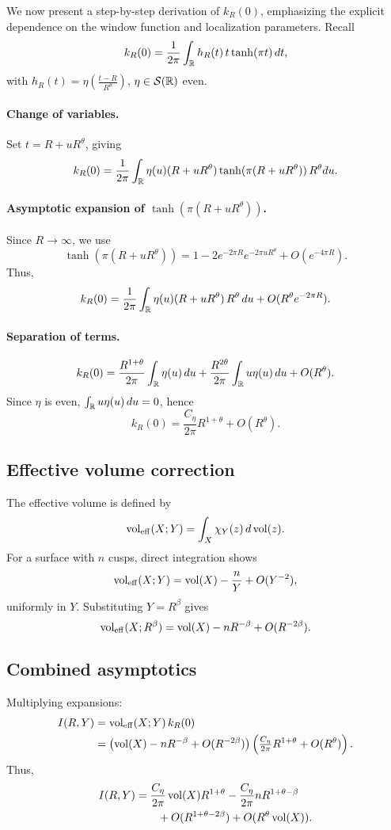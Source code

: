 We now present a step-by-step derivation of $k_R(0)$, emphasizing the explicit dependence on the window function and localization parameters. Recall
\[
k_R(0) = \frac{1}{2\pi}\int_{\mathbb{R}} h_R(t)\,t\tanh(\pi t)\,dt,
\]
with $h_R(t) = \eta\!\left(\tfrac{t-R}{R^\theta}\right)$, $\eta\in\mathcal{S}(\mathbb{R})$ even.

\paragraph{Change of variables.} Set $t=R+uR^\theta$, giving
\[
k_R(0) = \frac{1}{2\pi}\int_{\mathbb{R}} \eta(u)(R+uR^\theta)\tanh(\pi(R+uR^\theta))\,R^\theta du.
\]

\paragraph{Asymptotic expansion of $\tanh(\pi(R+uR^\theta))$.} Since $R\to\infty$, we use
\[
\tanh(\pi(R+uR^\theta)) = 1 - 2e^{-2\pi R}e^{-2\pi u R^\theta} + O(e^{-4\pi R}).
\]
Thus,
\[
k_R(0) = \frac{1}{2\pi}\int_{\mathbb{R}} \eta(u)(R+uR^\theta)\,R^\theta\,du + O(R^\theta e^{-2\pi R}).
\]

\paragraph{Separation of terms.}
\[
k_R(0) = \frac{R^{1+\theta}}{2\pi}\int_{\mathbb{R}} \eta(u)\,du + \frac{R^{2\theta}}{2\pi}\int_{\mathbb{R}} u\eta(u)\,du + O(R^\theta).
\]
Since $\eta$ is even, $\int_{\mathbb{R}} u\eta(u)\,du=0$, hence
\[
k_R(0) = \frac{C_\eta}{2\pi}R^{1+\theta} + O(R^\theta).
\]

\subsection{Effective volume correction}\label{subsec:identity-vol-eff}

The effective volume is defined by
\[
\operatorname{vol}_{\mathrm{eff}}(X;Y) = \int_X \chi_Y(z)\,d\operatorname{vol}(z).
\]
For a surface with $n$ cusps, direct integration shows
\[
\operatorname{vol}_{\mathrm{eff}}(X;Y) = \operatorname{vol}(X) - \frac{n}{Y} + O(Y^{-2}),
\]
uniformly in $Y$. Substituting $Y=R^\beta$ gives
\[
\operatorname{vol}_{\mathrm{eff}}(X;R^\beta) = \operatorname{vol}(X) - nR^{-\beta} + O(R^{-2\beta}).
\]

\subsection{Combined asymptotics}\label{subsec:identity-combined}

Multiplying expansions:
\begin{align*}
I(R,Y) &= \operatorname{vol}_{\mathrm{eff}}(X;Y)\,k_R(0) \\
&= \left(\operatorname{vol}(X) - nR^{-\beta} + O(R^{-2\beta})\right)\left(\tfrac{C_\eta}{2\pi}R^{1+\theta} + O(R^\theta)\right).
\end{align*}
Thus,
\begin{align*}
I(R,Y) &= \frac{C_\eta}{2\pi}\operatorname{vol}(X)R^{1+\theta} - \frac{C_\eta}{2\pi}nR^{1+\theta-\beta} \\
&\qquad+ O(R^{1+\theta-2\beta}) + O(R^\theta\operatorname{vol}(X)).
\end{align*}

